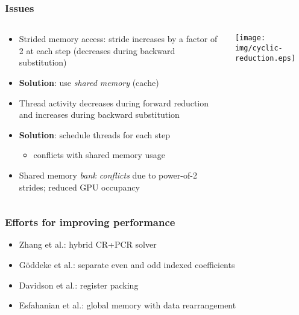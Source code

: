 \begin{frame}
\frametitle{Issues}
\footnotesize
\begin{columns}
\begin{column}{0.5\textwidth}
\begin{itemize}
    \item Strided memory access:
        stride increases by a factor of 2 at each step
        (decreases during backward substitution)
    \item \textbf{Solution}: use \emph{shared memory} (cache)
    \item Thread activity decreases during forward
        reduction and increases during backward substitution
    \item \textbf{Solution}: schedule threads for each step
        \begin{itemize}
            \footnotesize
            \item conflicts with shared memory usage
        \end{itemize}
    \item Shared memory \emph{bank conflicts}
        due to power-of-2 strides; reduced GPU occupancy
\end{itemize}
\end{column}
\begin{column}{0.5\textwidth}
\texttt{[image: img/cyclic-reduction.eps]}
\end{column}
\end{columns}
\end{frame}

\begin{frame}
\frametitle{Efforts for improving performance}
\begin{itemize}
    \item Zhang et al.: hybrid CR+PCR solver
    \item G{\"o}ddeke et al.: separate even and odd indexed
        coefficients
    \item Davidson et al.: register packing
    \item Esfahanian et al.: global memory with data rearrangement
\end{itemize}
\end{frame}


